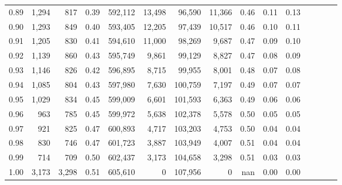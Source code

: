 \begin{tabular}{rrrcrrrrrrrrrrr}
0.89 &   1,294 &    817 &                                       0.39 &  592,112 &   13,498 &   96,590 &   11,366 &  0.46 &  0.11 &                         0.13 \\
0.90 &   1,293 &    849 &                                       0.40 &  593,405 &   12,205 &   97,439 &   10,517 &  0.46 &  0.10 &                         0.11 \\
0.91 &   1,205 &    830 &                                       0.41 &  594,610 &   11,000 &   98,269 &    9,687 &  0.47 &  0.09 &                         0.10 \\
0.92 &   1,139 &    860 &                                       0.43 &  595,749 &    9,861 &   99,129 &    8,827 &  0.47 &  0.08 &                         0.09 \\
0.93 &   1,146 &    826 &                                       0.42 &  596,895 &    8,715 &   99,955 &    8,001 &  0.48 &  0.07 &                         0.08 \\
0.94 &   1,085 &    804 &                                       0.43 &  597,980 &    7,630 &  100,759 &    7,197 &  0.49 &  0.07 &                         0.07 \\
0.95 &   1,029 &    834 &                                       0.45 &  599,009 &    6,601 &  101,593 &    6,363 &  0.49 &  0.06 &                         0.06 \\
0.96 &     963 &    785 &                                       0.45 &  599,972 &    5,638 &  102,378 &    5,578 &  0.50 &  0.05 &                         0.05 \\
0.97 &     921 &    825 &                                       0.47 &  600,893 &    4,717 &  103,203 &    4,753 &  0.50 &  0.04 &                         0.04 \\
0.98 &     830 &    746 &                                       0.47 &  601,723 &    3,887 &  103,949 &    4,007 &  0.51 &  0.04 &                         0.04 \\
0.99 &     714 &    709 &                                       0.50 &  602,437 &    3,173 &  104,658 &    3,298 &  0.51 &  0.03 &                         0.03 \\
1.00 &   3,173 &  3,298 &                                       0.51 &  605,610 &        0 &  107,956 &        0 &   nan &  0.00 &                         0.00 \\
\bottomrule
\end{tabular}

